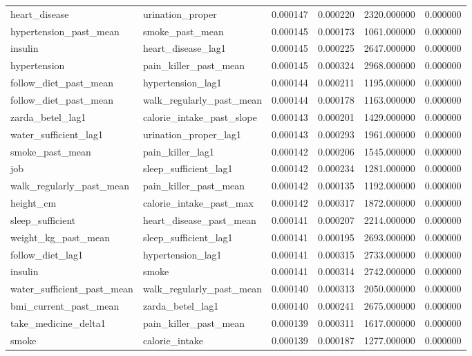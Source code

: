 \begin{longtable}{llrrrr}
heart\_disease & urination\_proper & 0.000147 & 0.000220 & 2320.000000 & 0.000000 \\
hypertension\_past\_mean & smoke\_past\_mean & 0.000145 & 0.000173 & 1061.000000 & 0.000000 \\
insulin & heart\_disease\_lag1 & 0.000145 & 0.000225 & 2647.000000 & 0.000000 \\
hypertension & pain\_killer\_past\_mean & 0.000145 & 0.000324 & 2968.000000 & 0.000000 \\
follow\_diet\_past\_mean & hypertension\_lag1 & 0.000144 & 0.000211 & 1195.000000 & 0.000000 \\
follow\_diet\_past\_mean & walk\_regularly\_past\_mean & 0.000144 & 0.000178 & 1163.000000 & 0.000000 \\
zarda\_betel\_lag1 & calorie\_intake\_past\_slope & 0.000143 & 0.000201 & 1429.000000 & 0.000000 \\
water\_sufficient\_lag1 & urination\_proper\_lag1 & 0.000143 & 0.000293 & 1961.000000 & 0.000000 \\
smoke\_past\_mean & pain\_killer\_lag1 & 0.000142 & 0.000206 & 1545.000000 & 0.000000 \\
job & sleep\_sufficient\_lag1 & 0.000142 & 0.000234 & 1281.000000 & 0.000000 \\
walk\_regularly\_past\_mean & pain\_killer\_past\_mean & 0.000142 & 0.000135 & 1192.000000 & 0.000000 \\
height\_cm & calorie\_intake\_past\_max & 0.000142 & 0.000317 & 1872.000000 & 0.000000 \\
sleep\_sufficient & heart\_disease\_past\_mean & 0.000141 & 0.000207 & 2214.000000 & 0.000000 \\
weight\_kg\_past\_mean & sleep\_sufficient\_lag1 & 0.000141 & 0.000195 & 2693.000000 & 0.000000 \\
follow\_diet\_lag1 & hypertension\_lag1 & 0.000141 & 0.000315 & 2733.000000 & 0.000000 \\
insulin & smoke & 0.000141 & 0.000314 & 2742.000000 & 0.000000 \\
water\_sufficient\_past\_mean & walk\_regularly\_past\_mean & 0.000140 & 0.000313 & 2050.000000 & 0.000000 \\
bmi\_current\_past\_mean & zarda\_betel\_lag1 & 0.000140 & 0.000241 & 2675.000000 & 0.000000 \\
take\_medicine\_delta1 & pain\_killer\_past\_mean & 0.000139 & 0.000311 & 1617.000000 & 0.000000 \\
smoke & calorie\_intake & 0.000139 & 0.000187 & 1277.000000 & 0.000000 \\

\end{longtable}
